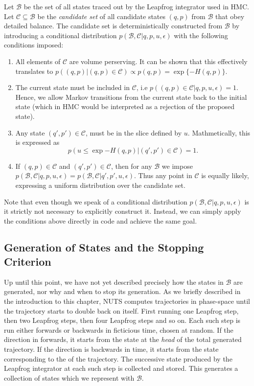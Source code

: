 Let $\mathcal{B}$ be the set of all states traced out by the Leapfrog integrator used in HMC. Let $\mathcal{C} \subseteq \mathcal{B}$ be 
the \textit{candidate set} of all candidate states $(q, p)$ from $\mathcal{B}$ that obey detailed balance. The candidate set is deterministically constructed from $\mathcal{B}$ by introducing a conditional distribution $p(\mathcal{B}, \mathcal{C}|q, p, u, \epsilon)$ with the following conditions imposed:
\begin{enumerate}
    \item All elements of $\mathcal{C}$ are volume perserving. It can be shown that this effectively translates to $p((q, p)|(q, p) \in \mathcal{C}) \propto p(q, p) = \exp\{-H(q, p)\}$.
    \item The current state must be included in $\mathcal{C}$, i.e $p\left((q, p) \in \mathcal{C}|q, p, u, \epsilon\right) = 1$. Hence, we allow Markov transitions from the current state back to the initial state (which in HMC would be interpreted as a rejection of the proposed state).
    \item Any state $(q', p') \in \mathcal{C}$, must be in the slice defined by $u$. 
    Mathmetically, this is expressed as $$p\left(u\leq \exp{-H(q, p)}\bigg|(q', p') \in \mathcal{C}\right) = 1.$$
    \item If $(q, p) \in \mathcal{C}$ and $(q', p') \in \mathcal{C}$, then for any $\mathcal{B}$ we impose 
    $p(\mathcal{B}, \mathcal{C}|q, p, u, \epsilon) = p(\mathcal{B}, \mathcal{C}|q', p', u, \epsilon)$.
    Thus any point in $\mathcal{C}$ is equally likely, expressing a uniform distribution over the candidate set.
\end{enumerate}
Note that even though we speak of a conditional distribution $p(\mathcal{B}, \mathcal{C}|q, p, u, \epsilon)$ is it strictly not necessary to explicitly construct it. Instead, we can simply apply the conditions above directly in code and achieve the same goal.


\subsection{Generation of States and the Stopping Criterion}
Up until this point, we have not yet described precisely how the states in $\mathcal{B}$ are generated,
nor why and when to stop its generation. As we briefly described in the introduction to this chapter, 
NUTS computes trajectories in phase-space until the trajectory starts to double back on itself. First running one Leapfrog step,
then two Leapfrog steps, then four Leapfrog steps and so on. Each such step is run either forwards or backwards in ficticious time, chosen at random.
If the direction in forwards, it starts from the state at the \textit{head} of the total generated trajectory. If the direction is backwards in time, it starts from the state corresponding to the  of the trajectory.
The successive state produced by the Leapfrog integrator at each such step is collected and stored. This generates a collection of states which we represent with $\mathcal{B}$. 

